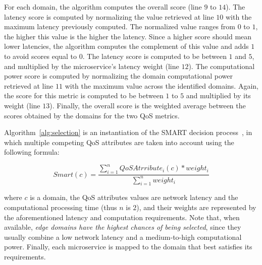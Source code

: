 For each domain, the algorithm computes the overall score (line $9$ to $14$). The latency score is computed by normalizing the value retrieved at line $10$ with the maximum latency previously computed. The normalized value ranges from $0$ to $1$, the higher this value is the higher the latency. Since a higher score should mean lower latencies, the algorithm computes the complement of this value and adds $1$ to avoid scores equal to $0$. The latency score is computed to be between $1$ and $5$, and multiplied by the microservice's latency weight (line $12$). The computational power score is computed by normalizing the domain computational power retrieved at line $11$ with the maximum value across the identified domains. Again, the score for this metric is computed to be between $1$ to $5$ and multiplied by its weight (line $13$). Finally, the overall score is the weighted average between the scores obtained by the domains for the two QoS metrics.

Algorithm~\ref{alg:selection} is an instantiation of the SMART decision process~\cite{Olson1996}, in which multiple competing QoS attributes are taken into account using the following formula:

\begin{equation}
Smart(c) = \frac{\sum_{i=1}^{n} QoSAtrribute_i(c)*weight_i}{\sum_{i=1}^{n}weight_i} \label{eq:smart}
\end{equation}

\noindent
where $c$ is a domain, the QoS attributes values are network latency and the computational processing time (thus $n$ is $2$), and their weights are represented by the aforementioned latency and computation requirements. Note that, when available, \textit{edge domains have the highest chances of being selected}, since they usually combine a low network latency and a medium-to-high computational power. Finally, each microservice is mapped to the domain that best satisfies its requirements.

